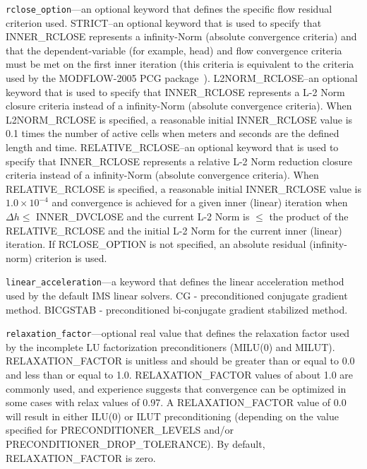 \begin{description}
\item \texttt{rclose\_option}---an optional keyword that defines the specific flow residual criterion used.  STRICT--an optional keyword that is used to specify that INNER\_RCLOSE represents a infinity-Norm (absolute convergence criteria) and that the dependent-variable (for example, head) and flow convergence criteria must be met on the first inner iteration (this criteria is equivalent to the criteria used by the MODFLOW-2005 PCG package~\citep{hill1990preconditioned}). L2NORM\_RCLOSE--an optional keyword that is used to specify that INNER\_RCLOSE represents a L-2 Norm closure criteria instead of a infinity-Norm (absolute convergence criteria). When L2NORM\_RCLOSE is specified, a reasonable initial INNER\_RCLOSE value is 0.1 times the number of active cells when meters and seconds are the defined \mf length and time.  RELATIVE\_RCLOSE--an optional keyword that is used to specify that INNER\_RCLOSE represents a relative L-2 Norm reduction closure criteria instead of a infinity-Norm (absolute convergence criteria). When RELATIVE\_RCLOSE is specified, a reasonable initial INNER\_RCLOSE value is $1.0 \times 10^{-4}$ and convergence is achieved for a given inner (linear) iteration when $\Delta h \le$ INNER\_DVCLOSE and the current L-2 Norm is $\le$ the product of the RELATIVE\_RCLOSE and the initial L-2 Norm for the current inner (linear) iteration. If RCLOSE\_OPTION is not specified, an absolute residual (infinity-norm) criterion is used.

\item \texttt{linear\_acceleration}---a keyword that defines the linear acceleration method used by the default IMS linear solvers.  CG - preconditioned conjugate gradient method.  BICGSTAB - preconditioned bi-conjugate gradient stabilized method.

\item \texttt{relaxation\_factor}---optional real value that defines the relaxation factor used by the incomplete LU factorization preconditioners (MILU(0) and MILUT). RELAXATION\_FACTOR is unitless and should be greater than or equal to 0.0 and less than or equal to 1.0. RELAXATION\_FACTOR values of about 1.0 are commonly used, and experience suggests that convergence can be optimized in some cases with relax values of 0.97. A RELAXATION\_FACTOR value of 0.0 will result in either ILU(0) or ILUT preconditioning (depending on the value specified for PRECONDITIONER\_LEVELS and/or PRECONDITIONER\_DROP\_TOLERANCE). By default,  RELAXATION\_FACTOR is zero.


\end{description}
